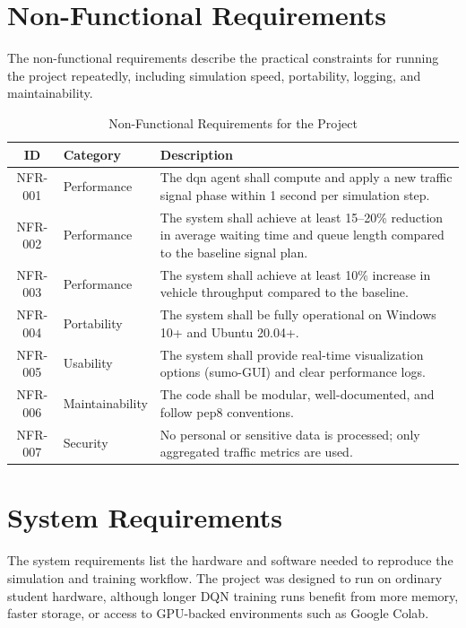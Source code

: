 \section{Non-Functional Requirements}
\label{sec:non_functional_requirements}

The non-functional requirements describe the practical constraints for running the project repeatedly, including simulation speed, portability, logging, and maintainability.

\begin{table}[H]
    \centering
    \small
    \caption{Non-Functional Requirements for the Project}
    \label{tab:non_functional_requirements}
    \begin{tabular}{cp{2.5cm}p{9cm}}
        \toprule
        \textbf{ID} & \textbf{Category} & \textbf{Description} \\
        \midrule
        NFR-001 & Performance & The \gls{dqn} agent shall compute and apply a new traffic signal phase within 1 second per simulation step. \\
        NFR-002 & Performance & The system shall achieve at least 15--20\% reduction in average waiting time and queue length compared to the baseline signal plan. \\
        NFR-003 & Performance & The system shall achieve at least 10\% increase in vehicle throughput compared to the baseline. \\
        NFR-004 & Portability & The system shall be fully operational on Windows 10+ and Ubuntu 20.04+. \\
        NFR-005 & Usability & The system shall provide real-time visualization options (\gls{sumo}-GUI) and clear performance logs. \\
        NFR-006 & Maintainability & The code shall be modular, well-documented, and follow \gls{pep8} conventions. \\
        NFR-007 & Security & No personal or sensitive data is processed; only aggregated traffic metrics are used. \\
        \bottomrule
    \end{tabular}
\end{table}

\section{System Requirements}
\label{sec:system_requirements}
The system requirements list the hardware and software needed to reproduce the simulation and training workflow. The project was designed to run on ordinary student hardware, although longer DQN training runs benefit from more memory, faster storage, or access to GPU-backed environments such as Google Colab.
